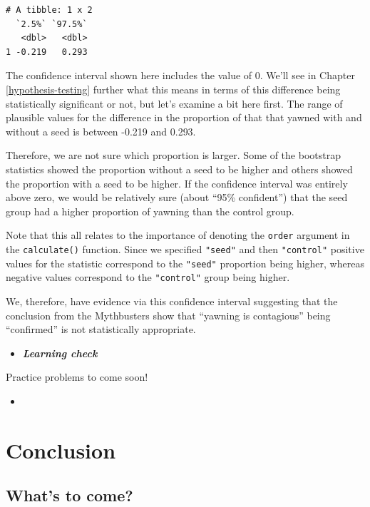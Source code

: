 \documentclass[12pt,]{krantz}
\newenvironment{rmdblock}[1]
  {\begin{shaded*}
  \begin{itemize}
  \renewcommand{\labelitemi}{
    \raisebox{-.7\height}[0pt][0pt]{
    }
  }
  \item
  }
  {
  \end{itemize}
  \end{shaded*}
  }
\newenvironment{learncheck}
  {\begin{rmdblock}{warning}}
  {\end{rmdblock}}
\theoremstyle{definition}
\theoremstyle{definition}
\theoremstyle{definition}
\theoremstyle{remark}
\begin{document}
\begin{verbatim}
# A tibble: 1 x 2
  `2.5%` `97.5%`
   <dbl>   <dbl>
1 -0.219   0.293
\end{verbatim}

The confidence interval shown here includes the value of 0. We'll see in
Chapter \ref{hypothesis-testing} further what this means in terms of
this difference being statistically significant or not, but let's
examine a bit here first. The range of plausible values for the
difference in the proportion of that that yawned with and without a seed
is between -0.219 and 0.293.

Therefore, we are not sure which proportion is larger. Some of the
bootstrap statistics showed the proportion without a seed to be higher
and others showed the proportion with a seed to be higher. If the
confidence interval was entirely above zero, we would be relatively sure
(about ``95\% confident'') that the seed group had a higher proportion
of yawning than the control group.

Note that this all relates to the importance of denoting the
\texttt{order} argument in the \texttt{calculate()} function. Since we
specified \texttt{"seed"} and then \texttt{"control"} positive values
for the statistic correspond to the \texttt{"seed"} proportion being
higher, whereas negative values correspond to the \texttt{"control"}
group being higher.

We, therefore, have evidence via this confidence interval suggesting
that the conclusion from the Mythbusters show that ``yawning is
contagious'' being ``confirmed'' is not statistically appropriate.

\begin{learncheck}
\textbf{\emph{Learning check}}
\end{learncheck}

Practice problems to come soon!

\begin{learncheck}

\end{learncheck}

\section{Conclusion}\label{conclusion-7}

\subsection{What's to come?}\label{whats-to-come-6}
\end{document}
